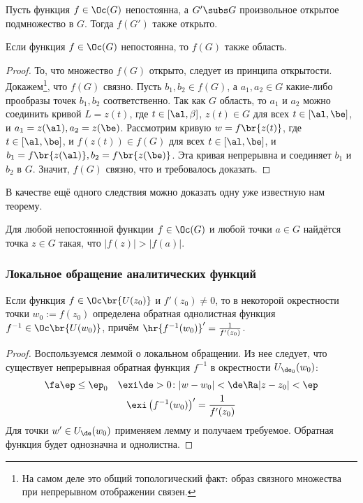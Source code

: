 \documentclass[a4paper]{article}
\begin{document}
\begin{theorem}
\begin{theorem}
Пусть функция $f\in \Oc(G)$ непостоянна, а $G'\subs G$ произвольное открытое подмножество в $G$. Тогда $f(G')$ также открыто.
\end{theorem}
\begin{theorem}
Если функция $f \in \Oc(G)$ непостоянна, то $f(G)$ также область.
\end{theorem}
\begin{proof}
То, что множество $f(G)$ открыто, следует из принципа открытости. Докажем\footnote{На самом деле это
общий топологический факт: образ связного множества при непрерывном отображении связен.}, что $f(G)$ связно. Пусть
$b_1, b_2 \in f(G)$, а $a_1,a_2\in G$ какие-либо прообразы точек $b_1, b_2$ соответственно.
Так как $G$ область, то $a_1$ и $a_2$ можно соединить кривой $L = z(t)$, где $t\in [\al,\beta]$,
$z(t)\in G$ для всех $t\in [\al, \be]$, и $a_1=z(\al), a_2=z(\be)$.
Рассмотрим кривую
$w=f\br{z(t)}$, где $t\in [\al,\be]$, и $f(z(t))\in f(G)$ для всех $t \in [\al, \be]$,
и $b_1=f\br{z(\al)}, b_2=f\br{z(\be)}$.
Эта кривая непрерывна и соединяет $b_1$ и $b_2$ в $G$. Значит, $f(G)$ связно, что и требовалось доказать.
\end{proof}

В качестве ещё одного следствия можно доказать одну уже известную нам теорему.
\begin{imp}
Для любой непостоянной функции $f\in\Oc(G)$ и любой точки $a\in G$ найдётся точка $z\in G$ такая, что $|f(z)|>|f(a)|$.
\end{imp}

\subsubsection{Локальное обращение аналитических функций}

\begin{theorem}\label{TheoremaOdin}
Если функция $f\in \Oc\br{U(z_0)}$ и $f'(z_0)\neq 0$, то в некоторой окрестности точки $w_0 := f(z_0)$
определена обратная однолистная функция $f^{-1} \in \Oc\br{U(w_0)}$, причём $\hr{f^{-1}(w_0)}'=\frac{1}{f'(z_0)}$.
\end{theorem}
\begin{proof}
Воспользуемся леммой о локальном обращении. Из нее следует, что существует
непрерывная обратная функция $f^{-1}$ в окрестности $U_{\de_0}(w_0)$:
\begin{gather*}
\fa \ep \le \ep_0 \quad \exi \de>0 \colon
|w-w_0|<\de \Ra |z-z_0|<\ep\\
\exi  \left( f^{-1}(w_0)\right)'=\frac{1}{f'(z_0)}
\end{gather*}
Для точки $w'\in U_\de(w_0)$ применяем лемму и
получаем требуемое. Обратная функция будет однозначна и однолистна.
\end{proof}


\end{theorem}
\end{document}
